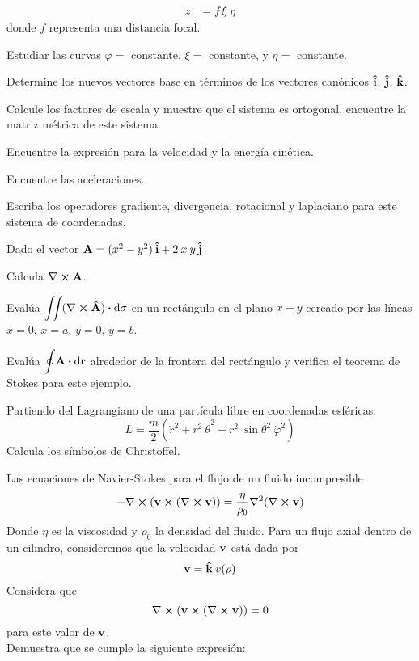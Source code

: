 \documentclass[12pt]{article}
\begin{document}
\begin{milista}
\begin{align*}
z &= f \, \xi \; \eta
\end{align*}
donde $f$ representa una distancia focal.
\begin{milista}
\item Estudiar las curvas $\varphi =$ constante, $\xi =$ constante, y  $\eta =$ constante.
\item Determine los nuevos vectores base en términos de los vectores canónicos $\vu{i}$, $\vu{j}$, $\vu{k}$.
\item Calcule los factores de escala y muestre que el sistema es ortogonal, encuentre la matriz métrica de este sistema.
\item Encuentre la expresión para la velocidad y la energía cinética.
\item Encuentre las aceleraciones.
\item Escriba los operadores gradiente, divergencia, rotacional y laplaciano para este sistema de coordenadas.
\end{milista}
\item Dado el vector $\vb{A} = (x^{2} - y^{2}) \: \vu{i} + 2 \: x \: y \: \vu{j}$
\begin{milista}
\item Calcula $\vb{\nabla} \cp \vb{A}$.
\item Evalúa $\mathlarger{\iint} (\vb{\nabla} \cp \vu{A}) \vdot \dd{\sigma} $ en un rectángulo en el plano $x-y$ cercado por las líneas $x=0$, $x=a$, $y=0$, $y=b$.
\item Evalúa $\mathlarger{\oint} \vb{A} \vdot \dd{\vb{r}}$ alrededor de la frontera del rectángulo y verifica el teorema de Stokes para este ejemplo.
\end{milista}
\item Partiendo del Lagrangiano de una partícula libre en coordenadas esféricas:
\[ L = \dfrac{m}{2} \left( \dot{r}^{2} + r^{2} \: \dot{\theta}^{2} + r^{2} \: \sin \theta^{2} \: \dot{\varphi}^{2} \right)\]
Calcula los símbolos de Christoffel.
\item Las ecuaciones de Navier-Stokes para el flujo de un fluido incompresible
\[ - \vb{\nabla} \cp ( \vb{v} \cp (\vb{\nabla} \cp \vb{v} )) =  \dfrac{\eta}{\rho_{0}} \vb{\nabla}^{2} (\vb{\nabla} \cp \vb{v}) \]
Donde $\eta$ es la viscosidad y $\rho_{0}$ la densidad del fluido. Para un flujo axial dentro de un cilindro, consideremos que la velocidad $\vb{v}$ está dada por
\[ \vb{v} =  \vu{k} \: v (\rho) \]
Considera que
\[ \vb{\nabla} \cp (\vb{v} \cp (\vb{\nabla} \cp \vb{v})) = 0 \]
para este valor de $\vb{v}$.
\\
Demuestra que se cumple la siguiente expresión:

\end{milista}
\end{document}
